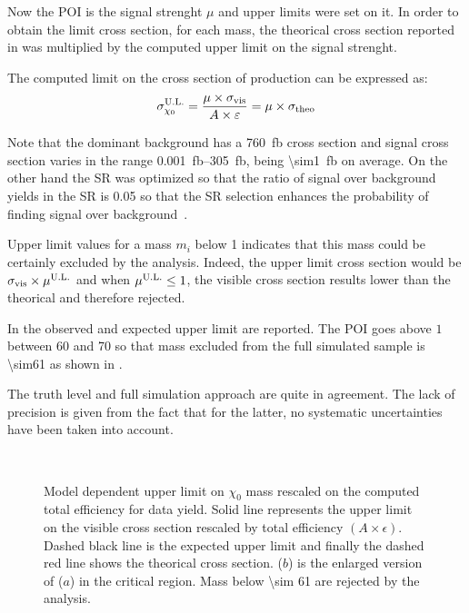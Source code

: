 Now the POI is the signal strenght $\mu$ and upper limits were set on it. In order to obtain the limit cross section, for each mass, the theorical cross section reported in \Tab{\ref{tab:eff}} was multiplied by the computed upper limit on the signal strenght. 

The computed limit on the cross section of \chizero production can be expressed as:
\begin{equation}
	\sigma_{\chi_0}^\textup{U.L.}=\frac{\mu\times\sigma_\textup{vis}}{A\times\epsilon}=\mu\times\sigma_\textup{theo}
\end{equation}

Note that the dominant background \znng has a \SI{760}{fb} cross section and signal cross section varies in the range \SIrange{0.001}{305}{fb}, being \SI{\sim1}{fb} on average. On the other hand the SR was optimized so that the ratio of signal over background yields in the SR is \num{0.05} so that the SR selection enhances the probability of finding signal over background~\cite{mgiulia}.

Upper limit values for a mass $m_i$ below \num{1} indicates that this mass could be certainly excluded by the analysis. Indeed, the upper limit cross section would be $\sigma_\textup{vis}\times \mu^\textup{U.L.}$ and when $\mu^\textup{U.L.} \le 1$, the visible cross section results lower than the theorical and therefore rejected.

In \Tab{\ref{tab:mu}} the observed and expected upper limit are reported. The POI goes above $1$ between \SI{60}{\gev} and \SI{70}{\gev} so that mass excluded from the full simulated sample is \SI{\sim61}{\gev} as shown in \Fig{\ref{fig:exclMD}}. 

The truth level and full simulation approach are quite in agreement. The lack of precision is given from the fact that for the latter, no systematic uncertainties have been taken into account.



\begin{figure}[tp]
\centering
{} \\
 \quad
\caption{Model dependent upper limit on $\chi_0$ mass rescaled on the computed total efficiency for data yield. Solid line represents the upper limit on the visible cross section rescaled by total efficiency $\left(A\times\epsilon\right)$. Dashed black line is the expected upper limit and finally the dashed red line shows the theorical cross section. ($b$) is the enlarged version of ($a$) in the critical region. Mass below \SI{\sim 61}{\gev} are rejected by the analysis.}
\label{fig:exclMI}
\end{figure}










